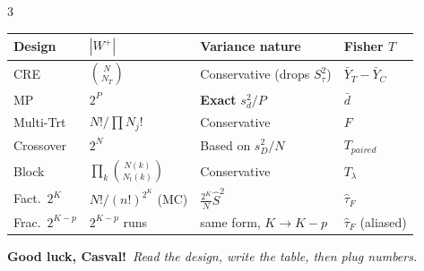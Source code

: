 \documentclass[10pt,landscape]{article}
\begin{document}
\begin{multicols*}{3}
\begin{infobox}[title=Final cheat summary]
\footnotesize
\begin{tabular}{p{1.6cm}p{1.6cm}p{2.1cm}p{1.7cm}}
\toprule
Design & $|W^+|$ & Variance nature & Fisher $T$ \\
\midrule
CRE & $\binom{N}{N_T}$ & Conservative (drops $S_\tau^2$) & $\bar Y_T-\bar Y_C$ \\
MP & $2^P$ & \textbf{Exact} $s_d^2/P$ & $\bar d$ \\
Multi-Trt & $N!/\prod N_j!$ & Conservative & $F$ \\
Crossover & $2^N$ & Based on $s_D^2/N$ & $T_{paired}$ \\
Block & $\prod_k\binom{N(k)}{N_t(k)}$ & Conservative & $T_\lambda$ \\
Fact.\ $2^K$ & $N!/(n!)^{2^K}$ (MC) & $\tfrac{2^K}{N}\hat S^2$ & $\hat\tau_F$ \\
Frac.\ $2^{K-p}$ & $2^{K-p}$ runs & same form, $K\to K-p$ & $\hat\tau_F$ (aliased) \\
\bottomrule
\end{tabular}
\end{infobox}

\begin{center}\color{hdr}\textbf{Good luck, Casval!}\ \textit{Read the design, write the table, then plug numbers.} \end{center}

\end{multicols*}
\end{document}
